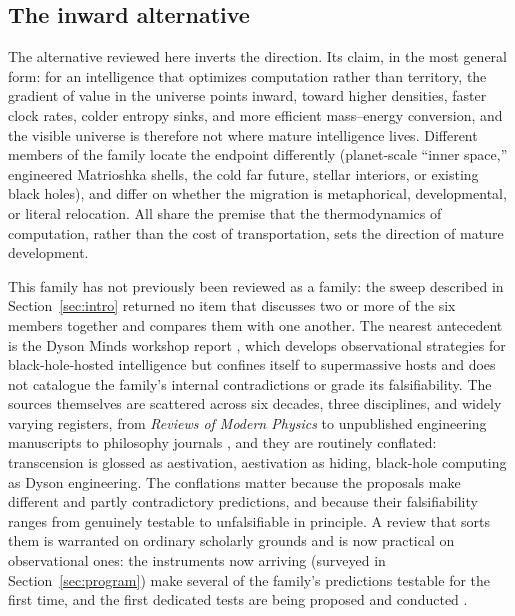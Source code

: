 \documentclass[11pt]{article}
\begin{document}
\subsection{The inward alternative}

The alternative reviewed here inverts the direction. Its claim, in the most general form: for an intelligence that optimizes computation rather than territory, the gradient of value in the universe points inward, toward higher densities, faster clock rates, colder entropy sinks, and more efficient mass--energy conversion, and the visible universe is therefore not where mature intelligence lives. Different members of the family locate the endpoint differently (planet-scale ``inner space,'' engineered Matrioshka shells, the cold far future, stellar interiors, or existing black holes), and differ on whether the migration is metaphorical, developmental, or literal relocation. All share the premise that the thermodynamics of computation, rather than the cost of transportation, sets the direction of mature development.

This family has not previously been reviewed as a family: the sweep described in Section~\ref{sec:intro} returned no item that discusses two or more of the six members together and compares them with one another. The nearest antecedent is the Dyson Minds workshop report \citep{Curtis2026DysonMinds}, which develops observational strategies for black-hole-hosted intelligence but confines itself to supermassive hosts and does not catalogue the family's internal contradictions or grade its falsifiability. The sources themselves are scattered across six decades, three disciplines, and widely varying registers, from \emph{Reviews of Modern Physics} \citep{Dyson1979} to unpublished engineering manuscripts \citep{Bradbury1999} to philosophy journals \citep{Bostrom2003}, and they are routinely conflated: transcension is glossed as aestivation, aestivation as hiding, black-hole computing as Dyson engineering. The conflations matter because the proposals make different and partly contradictory predictions, and because their falsifiability ranges from genuinely testable to unfalsifiable in principle. A review that sorts them is warranted on ordinary scholarly grounds and is now practical on observational ones: the instruments now arriving (surveyed in Section~\ref{sec:program}) make several of the family's predictions testable for the first time, and the first dedicated tests are being proposed and conducted \citep{Huang2026,Swanson2026Campaign}.
\end{document}
